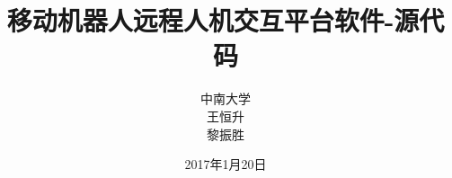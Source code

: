 \documentclass[a4paper,oneside,cs4size,fancyhdr,titlepage]{ctexart}
\title{移动机器人远程人机交互平台软件-源代码}
\author{中南大学\\王恒升\\黎振胜}
\date{2017年1月20日}
\begin{document}
\maketitle{}





\end{document}

